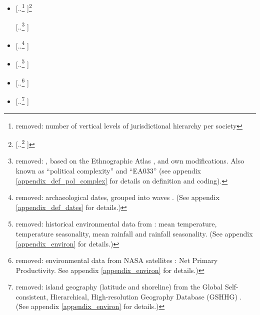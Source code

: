 \documentclass[unnumsec,webpdf,modern,medium]{oup-authoring-template}
\providecommand{\DIFdeltex}[1]{{\protect\color{red} [..\footnote{removed: #1} ]}} %
\providecommand{\DIFdel}[1]{\texorpdfstring{\DIFdeltex{#1}}{}} %
\begin{document}
\begin{itemize}%
\item%
\DIFdel{number of vertical levels of jurisdictional hierarchy per society }\footnote{\DIFdel{Nota Bene that there are other kinds of political complexity besides vertical, for example, horizontal complex exchange networks. See Appendix \ref{appendix_def_pol_complex} for more.}}%
\addtocounter{footnote}{-1}%
\DIFdel{, based on the Ethnographic Atlas \citep{gray1998ethnographic, d_place_all}, \citet{sheehan2018coevolution} and own modifications. Also known as ``political complexity'' and ``EA033'' (see appendix \ref{appendix_def_pol_complex} for details on definition and coding). }%
\item%
\DIFdel{archaeological dates, grouped into waves \citep{intoh2007reconnaissance, intoh2008ongoing, rieth_cochrane_2018, levin_seikel_miles_2019, pol_outliers_stat_art, Napolitano_et_al_yap}. (See appendix \ref{appendix_def_dates} for details.)}%
\item%
\DIFdel{historical environmental data from \citet{ecoclimate}: mean temperature, temperature seasonality, mean rainfall and rainfall seasonality.
(See appendix \ref{appendix_environ} for details.)
}%
\item%
\DIFdel{environmental data from NASA satellites \citep{running2021modis_aqua, running2021modis_terra}: Net Primary Productivity. See appendix \ref{appendix_environ} for details.)
}%
\item%
\DIFdel{island geography (latitude and shoreline) from the Global Self-consistent, Hierarchical, High-resolution Geography Database (GSHHG) \citep{wessel1996global}.  (See appendix \ref{appendix_environ} for details.)
}
\end{itemize}%
\end{document}
